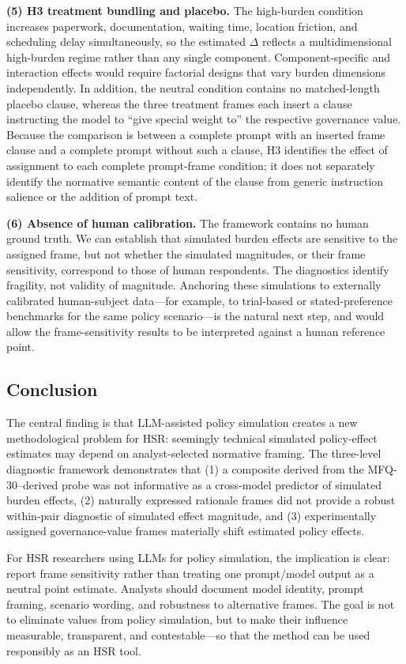 \documentclass[12pt,a4paper]{article}
\begin{document}
\textbf{(5) H3 treatment bundling and placebo.} The high-burden condition increases paperwork, documentation, waiting time, location friction, and scheduling delay simultaneously, so the estimated $\Delta$ reflects a multidimensional high-burden regime rather than any single component. Component-specific and interaction effects would require factorial designs that vary burden dimensions independently. In addition, the neutral condition contains no matched-length placebo clause, whereas the three treatment frames each insert a clause instructing the model to ``give special weight to'' the respective governance value. Because the comparison is between a complete prompt with an inserted frame clause and a complete prompt without such a clause, H3 identifies the effect of assignment to each complete prompt-frame condition; it does not separately identify the normative semantic content of the clause from generic instruction salience or the addition of prompt text.

\textbf{(6) Absence of human calibration.} The framework contains no human ground truth. We can establish that simulated burden effects are sensitive to the assigned frame, but not whether the simulated magnitudes, or their frame sensitivity, correspond to those of human respondents. The diagnostics identify fragility, not validity of magnitude. Anchoring these simulations to externally calibrated human-subject data---for example, to trial-based or stated-preference benchmarks for the same policy scenario---is the natural next step, and would allow the frame-sensitivity results to be interpreted against a human reference point.

\subsection{Conclusion}

The central finding is that LLM-assisted policy simulation creates a new methodological problem for HSR: seemingly technical simulated policy-effect estimates may depend on analyst-selected normative framing. The three-level diagnostic framework demonstrates that (1) a composite derived from the MFQ-30--derived probe was not informative as a cross-model predictor of simulated burden effects, (2) naturally expressed rationale frames did not provide a robust within-pair diagnostic of simulated effect magnitude, and (3) experimentally assigned governance-value frames materially shift estimated policy effects.

For HSR researchers using LLMs for policy simulation, the implication is clear: report frame sensitivity rather than treating one prompt/model output as a neutral point estimate. Analysts should document model identity, prompt framing, scenario wording, and robustness to alternative frames. The goal is not to eliminate values from policy simulation, but to make their influence measurable, transparent, and contestable---so that the method can be used responsibly as an HSR tool.
\end{document}
